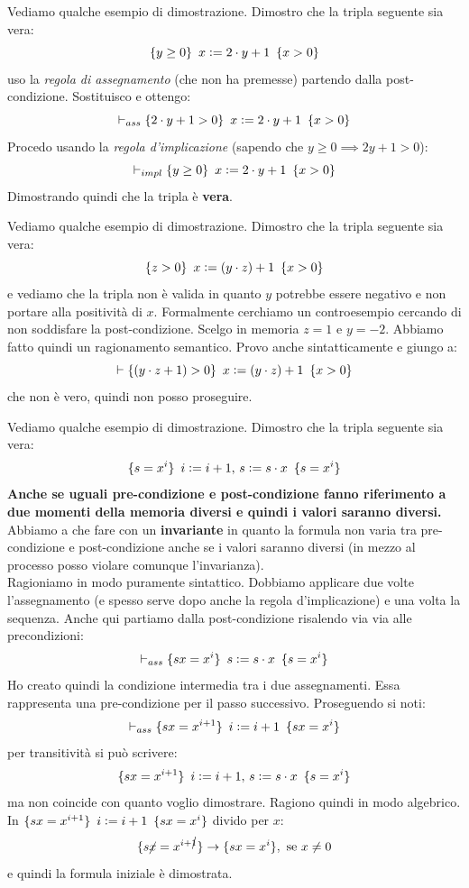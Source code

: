\begin{esempio}
	Vediamo qualche esempio di dimostrazione. Dimostro che la tripla seguente sia
	vera:
	\[\{y\geq 0\}\,\,\, x\cceq 2\cdot y+1\,\,\,\{x>0\}\]
	uso la \emph{regola di assegnamento} (che non ha premesse) partendo dalla
	post-condizione. Sostituisco e ottengo:
	\[\vdash_{ass}\{2\cdot y+1> 0\}\,\,\, x\cceq 2\cdot y+1\,\,\,\{x>0\}\]
	Procedo usando la \emph{regola d'implicazione} (sapendo che $y\geq 0\implies
	2y+1>0$):
	\[\vdash_{impl}\{y\geq 0\}\,\,\, x\cceq 2\cdot y+1\,\,\,\{x>0\}\]
	Dimostrando quindi che la tripla è \textbf{vera}.
\end{esempio}
\begin{esempio}
	Vediamo qualche esempio di dimostrazione. Dimostro che la tripla seguente sia
	vera:
	\[\{z> 0\}\,\,\, x\cceq (y\cdot z)+1\,\,\,\{x>0\}\]
	e vediamo che la tripla non è valida in quanto $y$ potrebbe essere negativo e
	non portare alla positività di $x$. Formalmente cerchiamo un controesempio
	cercando di non soddisfare la post-condizione. Scelgo in memoria $z=1$ e
	$y=-2$. Abbiamo fatto quindi un ragionamento semantico. Provo anche
	sintatticamente e giungo a:
	\[\vdash\{(y\cdot z+1)> 0\}\,\,\, x\cceq (y\cdot z)+1\,\,\,\{x>0\}\]
	che non è vero, quindi non posso proseguire.
\end{esempio}
\begin{esempio}
	Vediamo qualche esempio di dimostrazione. Dimostro che la tripla seguente sia
	vera:
	\[\{s=x^i\}\,\,\, i\cceq i+1,\, s\cceq s\cdot x\,\,\,\{s=x^i\}\]
	\textbf{Anche se uguali pre-condizione e post-condizione fanno riferimento a due momenti
		della memoria diversi e quindi i valori saranno diversi.}\\
	Abbiamo a che fare con un \textbf{invariante} in quanto la formula non varia
	tra pre-condizione e post-condizione anche se i valori saranno diversi (in mezzo
	al processo posso violare comunque l'invarianza).\\
	Ragioniamo in modo puramente sintattico. Dobbiamo applicare due volte
	l'assegnamento (e spesso serve dopo anche la regola d'implicazione) e una
	volta la sequenza. Anche qui partiamo dalla post-condizione risalendo via via
	alle precondizioni:
	\[\vdash_{ass}\{sx=x^i\}\,\,\, s\cceq s\cdot x\,\,\,\{s=x^i\}\]
	Ho creato quindi la condizione intermedia tra i due assegnamenti. Essa rappresenta una pre-condizione per il passo successivo. Proseguendo si noti:
	\[\vdash_{ass}\{sx=x^{i+1}\}\,\,\, i\cceq i+1\,\,\,\{sx=x^i\}\]
	per transitività si può scrivere:
	\[\{sx=x^{i+1}\}\,\,\, i\cceq i+1,\, s\cceq s\cdot x\,\,\,\{s=x^i\}\]
	ma non coincide con quanto voglio dimostrare. Ragiono quindi in modo
	algebrico. In $\{sx=x^{i+1}\}\,\,\, i\cceq i+1\,\,\,\{sx=x^i\}$ divido per $x$:
	\[\{s\cancel{x}=x^{i+\cancel{1}}\}\to\{sx=x^i\},\mbox{ se }x\neq 0\]
	e quindi la formula iniziale è dimostrata.
\end{esempio}
